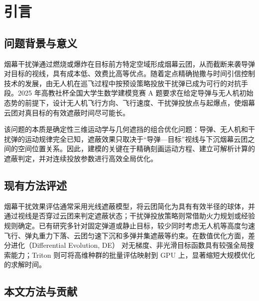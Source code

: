 \documentclass[11pt,a4paper]{ctexart}
\begin{document}
\setcounter{tocdepth}{1}
{\small
\setlength{\baselineskip}{10.8pt}
\tableofcontents
}
\newpage

\section{引言}

\subsection{问题背景与意义}

烟幕干扰弹通过燃烧或爆炸在目标前方特定空域形成烟幕云团，从而截断来袭导弹对目标的视线，具有成本低、效费比高等优点。随着定点精确抛撒与时间引信控制技术的发展，由无人机在巡飞过程中按预设策略投放干扰弹已成为可行的对抗手段。2025 年高教社杯全国大学生数学建模竞赛 A 题要求在给定导弹与无人机初始态势的前提下，设计无人机飞行方向、飞行速度、干扰弹投放点与起爆点，使烟幕云团对真目标的有效遮蔽时间尽可能长。

该问题的本质是确定性三维运动学与几何遮挡的组合优化问题：导弹、无人机和干扰弹的运动规律完全已知，遮蔽效果只取决于“导弹—目标”视线与下沉烟幕云团之间的空间位置关系。因此，建模的关键在于精确刻画运动方程、建立可解析计算的遮蔽判定，并对连续投放参数进行高效全局优化。

\subsection{现有方法评述}

烟幕干扰效果评估通常采用光线遮蔽模型，将云团简化为具有有效半径的球体，并通过视线是否穿过云团来判定遮蔽状态；干扰弹投放策略则常借助火力规划或经验规则确定。已有研究多针对固定弹道或静止目标，较少同时考虑无人机等高度匀速飞行、弹丸重力下落、云团匀速下沉和多弹并集遮蔽等约束。在数值优化方面，差分进化（Differential Evolution, DE）\cite{storn1997} 对无梯度、非光滑目标函数具有较强全局搜索能力；Triton \cite{triton2019} 则可将高维种群的批量评估映射到 GPU 上，显著缩短大规模优化的求解时间。

\subsection{本文方法与贡献}
\end{document}
